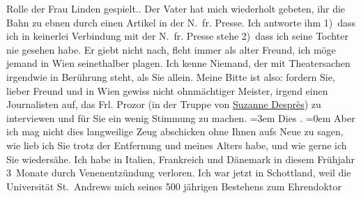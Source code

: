 \begin{ledgroupsized}[t]{13cm}
{{{                  Rolle der Frau Linden
                  gespielt.}}}\label{K_L02033-1h}. Der Vater hat mich wiederholt gebeten, ihr die Bahn zu ebnen durch einen Artikel
               in der N. fr. Presse. Ich antworte ihm 1) dass
               ich in keinerlei Verbindung mit der N. fr. Presse
               stehe 2) dass ich seine Tochter nie gesehen habe.\pend
           \pstart
           Er giebt nicht nach, fleht immer als alter Freund, ich möge jemand in Wien seinet{\pb}halber plagen.\pend
           \pstart
           Ich kenne Niemand, der mit Theatersachen irgendwie in Berührung steht, als Sie
               allein.\pend
           \pstart
           Meine Bitte ist also: fordern Sie, lieber Freund und in Wien gewiss nicht ohnmächtiger Meister, irgend einen Journalisten auf, das
               Frl. Prozor (in der Truppe von \uline{Suzanne Desprès}) zu interviewen und für Sie ein wenig Stimmung zu machen.\pend
           \leftskip=3em{}\pstart
           \noindent{}Dies \label{K_L02033-2v}\label{K_L02033-2h}.\pend
           \leftskip=0em{}\pstart
           \noindent{}Aber ich mag nicht dies langweilige Zeug abschicken ohne Ihnen aufs Neue zu sagen,
               wie lieb ich Sie trotz der Entfernung und meines Alters habe, und wie gerne ich Sie
               wiedersähe.\pend
           \pstart
           Ich habe in Italien, Frankreich und Dänemark in
               diesem Frühjahr 3 Monate durch Venenentzündung verloren. Ich war jetzt in {\pb}Schottland, weil die Universität St. Andrews mich \label{K_L02033-3v}\label{K_L02033-3h} seines 500 jährigen Bestehens zum Ehrendoktor

\end{ledgroupsized}
